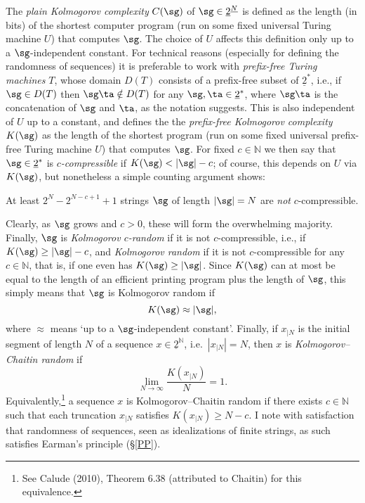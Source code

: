 \documentclass[12pt]{article}
\numberwithin{equation}{section}
\newcommand{\beq}{\begin{equation}}
\newcommand{\eeq}{\end{equation}}
\newcommand{\ul}{\underline}
\newcommand{\raw}{\rightarrow}
\newcommand{\N}{{\mathbb N}} \newcommand{\R}{{\mathbb R}}
\begin{document}
The \emph{plain Kolmogorov complexity}  $C(\sg)$ of $\sg\in \ul{2}^{\ul{N}}$ is defined as the length (in bits) of the shortest computer program (run on some fixed universal Turing machine $U$) that computes $\sg$. The choice of $U$ affects this definition only up to a $\sg$-independent constant. For technical reasons (especially for defining the randomness of sequences) it is preferable to work with \emph{prefix-free Turing machines} $T$, whose domain $D(T)$ consists of a prefix-free subset of $\ul{2}^*$, i.e., if $\sg\in D(T)$ then $\sg\ta\notin D(T)$ for any $\sg,\ta\in \ul{2}^*$, where $\sg\ta$ is  the concatenation of $\sg$ and $\ta$, as the notation suggests. This is also independent of $U$ up to a constant, and defines the
the \emph{prefix-free Kolmogorov complexity} $K(\sg)$ as  the length of the shortest  program (run on some fixed universal prefix-free Turing machine $U$) that computes $\sg$. 
For fixed  $c\in\N$ we then say that $\sg\in \ul{2}^*$ is \emph{$c$-compressible} if $K(\sg)<|\sg|-c$; of course, this  depends on $U$ via $K(\sg)$, but nonetheless a simple counting argument shows:
\begin{center}
 At least $2^N-2^{N-c+1}+1$ strings $\sg$ of length $|\sg|=N$ are 
\emph{not} $c$-compressible. 
\end{center}
Clearly, as $\sg$ grows and $c>0$, these will form the overwhelming majority. Finally, $\sg$ is
\emph{Kolmogorov $c$-random} if it is not  $c$-compressible, i.e., if $K(\sg)\geq |\sg|-c$, and 
\emph{Kolmogorov random} if it is not  $c$-compressible for any $c\in\N$, that is, if one even has $K(\sg)\geq |\sg|$. Since $K(\sg)$ can at most be equal to the length of an efficient printing program plus the length of $\sg$, this simply means that $\sg$ is Kolmogorov random if 
\beq
K(\sg)\approx |\sg|,
\eeq
where  $\approx$ means `up to a $\sg$-independent constant'. Finally, if $x_{|N}$ is the initial segment of length $N$ of 
a sequence $x\in\ul{2}^{\N}$, i.e.\  $|x_{|N}|=N$, then $x$ is  \emph{Kolmogorov--Chaitin random} if
\begin{equation}
\lim_{N\raw\infty} \frac{K(x_{|N})}{N}=1.\label{Calude}
\end{equation}
Equivalently,\footnote{See Calude (2010), Theorem 6.38 (attributed to Chaitin) for this equivalence.}
 a sequence $x$ is Kolmogorov--Chaitin random if there exists $c\in\N$ such that each truncation $x_{|N}$ 
satisfies   $K(x_{|N})\geq N - c$.  I note with satisfaction that randomness of sequences, seen as idealizations of finite strings, as such satisfies Earman's principle (\S\ref{PP}).
\end{document}
